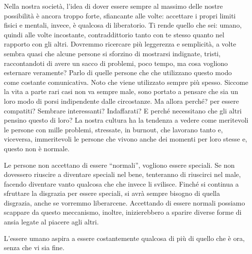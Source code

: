 \documentclass[12pt]{book} %
\begin{document}
\bigskip

Nella nostra società, l'idea di dover essere sempre al massimo delle nostre possibilità è ancora
troppo forte, sfiancante alle volte: accettare i propri limiti fisici e mentali, invece, è qualcosa di liberatorio. Ti
rende quello che sei: umano, quindi alle volte incostante, contraddittorio tanto con te stesso quanto nel rapporto con
gli altri. Dovremmo ricercare più
leggerezza e semplicità, a volte sembra quasi che alcune persone si sforzino di mostrarsi indignate, tristi,
raccontandoti di avere un sacco di problemi, poco tempo, ma cosa vogliono esternare veramente? Parlo di quelle persone
che che utilizzano questo modo come costante comunicativa. Noto che viene utilizzato sempre più spesso. Siccome la vita
a parte rari casi non va sempre male, sono portato a pensare che sia un loro modo di porsi indipendente dalle
circostanze. Ma allora perché? per essere compatiti? Sembrare interessanti? Indaffarati? E perché necessitano che gli
altri pensino questo di loro? La nostra cultura ha la tendenza a vedere come meritevoli le persone con mille problemi,
stressate, in burnout, che lavorano tanto e, viceversa, immeritevoli le persone che vivono anche dei momenti per loro
stesse e, questo non è normale. 

Le persone non accettano di essere “normali”, vogliono essere speciali. Se non dovessero riuscire a diventare speciali
nel bene, tenteranno di riuscirci nel male, facendo diventare vanto qualcosa che che invece li svilisce. Finché si
continua a sfruttare la disgrazia per essere speciali, si avrà sempre bisogno di quella disgrazia, anche se vorremmo
liberarcene. Accettando di essere normali possiamo scappare da questo meccanismo, inoltre, inizierebbero a sparire
diverse forme di ansia legate al piacere agli altri. 

L'essere umano aspira a essere costantemente qualcosa di più di quello che è ora, senza che vi sia fine.
\end{document}
